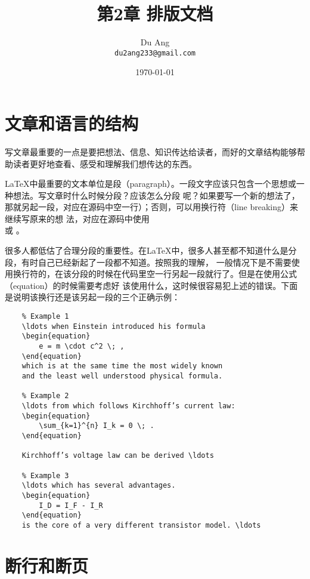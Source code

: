 \documentclass[UTF8]{ctexart}
\title{\heiti 第2章 \quad 排版文档}
\author{\kaishu Du Ang \\ \texttt{du2ang233@gmail.com} }
\date{\today}
\begin{document}
\maketitle

\tableofcontents

\newpage
\section{文章和语言的结构}
写文章最重要的一点是要把想法、信息、知识传达给读者，而好的文章结构能够帮助读者更好地查看、感受和理解我们想传达的东西。

\LaTeX 中最重要的文本单位是段（paragraph）。一段文字应该只包含一个思想或一种想法。写文章时什么时候分段？应该怎么分段
呢？如果要写一个新的想法了，那就另起一段，对应在源码中空一行）；否则，可以用换行符（line breaking）来继续写原来的想
法，对应在源码中使用 \texttt{\\} 或 \texttt{\newline}。

很多人都低估了合理分段的重要性。在\LaTeX 中，很多人甚至都不知道什么是分段，有时自己已经新起了一段都不知道。按照我的理解，
一般情况下是不需要使用换行符的，在该分段的时候在代码里空一行另起一段就行了。但是在使用公式（equation）的时候需要考虑好
该使用什么，这时候很容易犯上述的错误。下面是说明该换行还是该另起一段的三个正确示例：
\begin{verbatim}
    % Example 1
    \ldots when Einstein introduced his formula
    \begin{equation}
        e = m \cdot c^2 \; ,
    \end{equation}
    which is at the same time the most widely known
    and the least well understood physical formula.

    % Example 2
    \ldots from which follows Kirchhoff’s current law:
    \begin{equation}
        \sum_{k=1}^{n} I_k = 0 \; .
    \end{equation}

    Kirchhoff’s voltage law can be derived \ldots

    % Example 3
    \ldots which has several advantages.
    \begin{equation}
        I_D = I_F - I_R
    \end{equation}
    is the core of a very different transistor model. \ldots
\end{verbatim}

\section{断行和断页}
\end{document}
